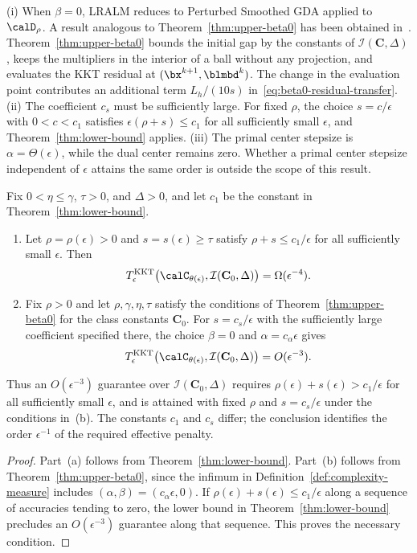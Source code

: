 \begin{remark}
\label{rem:upper-beta0}
(i) When \(\beta=0\), LRALM reduces to Perturbed Smoothed GDA applied to
\(\calD_\rho\). A result analogous to Theorem~\ref{thm:upper-beta0} has
been obtained in~\cite[Theorem~3.3]{li2026smoothing}.
Theorem~\ref{thm:upper-beta0} bounds the initial gap by the constants of
\(\mathcal I(\mathbf C,\Delta)\), keeps the multipliers in the interior of
a ball without any projection, and evaluates the KKT residual at
\((\bx^{k+1},\blmbd^k)\). The change in the evaluation point contributes
an additional term \(L_h/(10s)\) in~\eqref{eq:beta0-residual-transfer}.
(ii) The coefficient \(c_s\) must be sufficiently large. For fixed \(\rho\),
the choice \(s=c/\epsilon\) with \(0<c<c_1\) satisfies
\(\epsilon(\rho+s)\le c_1\) for all sufficiently small \(\epsilon\), and
Theorem~\ref{thm:lower-bound} applies.
(iii) The primal center stepsize is \(\alpha=\Theta(\epsilon)\), while the
dual center remains zero. Whether a primal center stepsize independent of
\(\epsilon\) attains the same order is outside the scope of this result.
\end{remark}

\begin{corollary}
\label{cor:effective-penalty}
Fix \(0<\eta\le\gamma\), \(\tau>0\), and \(\Delta>0\), and let \(c_1\)
be the constant in Theorem~\ref{thm:lower-bound}.
\begin{enumerate}[label=(\alph*)]
\item Let \(\rho=\rho(\epsilon)>0\) and \(s=s(\epsilon)\ge\tau\) satisfy
\(\rho+s\le c_1/\epsilon\) for all sufficiently small \(\epsilon\).
Then
\[
T^{\mathrm{KKT}}_\epsilon
\bigl(\calC_{\theta(\epsilon)},\mathcal I(\mathbf C_0,\Delta)\bigr)
=\Omega(\epsilon^{-4}).
\]
\item Fix \(\rho>0\) and let \(\rho,\gamma,\eta,\tau\) satisfy the
conditions of Theorem~\ref{thm:upper-beta0} for the class constants
\(\mathbf C_0\). For \(s=c_s/\epsilon\) with the sufficiently large
coefficient specified there, the choice \(\beta=0\) and
\(\alpha=c_\alpha\epsilon\) gives
\[
T^{\mathrm{KKT}}_\epsilon
\bigl(\calC_{\theta(\epsilon)},\mathcal I(\mathbf C_0,\Delta)\bigr)
=O(\epsilon^{-3}).
\]
\end{enumerate}
Thus an \(O(\epsilon^{-3})\) guarantee over
\(\mathcal I(\mathbf C_0,\Delta)\) requires
\(\rho(\epsilon)+s(\epsilon)>c_1/\epsilon\) for all sufficiently small
\(\epsilon\), and is attained with fixed \(\rho\) and
\(s=c_s/\epsilon\) under the conditions in~(b).
The constants \(c_1\) and \(c_s\) differ; the conclusion identifies the
order \(\epsilon^{-1}\) of the required effective penalty.
\end{corollary}
\begin{proof}
Part~(a) follows from Theorem~\ref{thm:lower-bound}. Part~(b) follows from
Theorem~\ref{thm:upper-beta0}, since the infimum in
Definition~\ref{def:complexity-measure} includes
\((\alpha,\beta)=(c_\alpha\epsilon,0)\). If
\(\rho(\epsilon)+s(\epsilon)\le c_1/\epsilon\) along a sequence of
accuracies tending to zero, the lower bound in
Theorem~\ref{thm:lower-bound} precludes an \(O(\epsilon^{-3})\) guarantee
along that sequence. This proves the necessary condition.
\end{proof}
